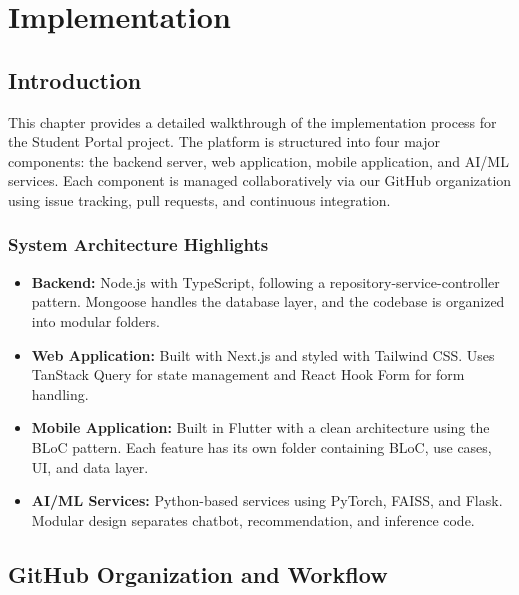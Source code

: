 \lstset{style=mystyle}

\section{Implementation}
\label{sec:implementation}

\subsection{Introduction}
\label{subsec:introduction}

This chapter provides a detailed walkthrough of the implementation process for the Student Portal project. The platform is structured into four major components: the backend server, web application, mobile application, and AI/ML services. Each component is managed collaboratively via our GitHub organization using issue tracking, pull requests, and continuous integration.

\subsubsection{System Architecture Highlights}

\begin{itemize}
    \item \textbf{Backend:} Node.js with TypeScript, following a repository-service-controller pattern. Mongoose handles the database layer, and the codebase is organized into modular folders.
    
    \item \textbf{Web Application:} Built with Next.js and styled with Tailwind CSS. Uses TanStack Query for state management and React Hook Form for form handling.
    
    \item \textbf{Mobile Application:} Built in Flutter with a clean architecture using the BLoC pattern. Each feature has its own folder containing BLoC, use cases, UI, and data layer.
    
    \item \textbf{AI/ML Services:} Python-based services using PyTorch, FAISS, and Flask. Modular design separates chatbot, recommendation, and inference code.
\end{itemize}

\subsection{GitHub Organization and Workflow}
\label{subsec:github_workflow}


